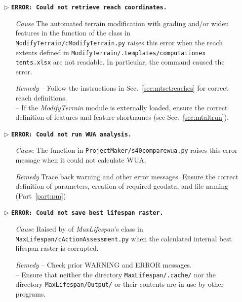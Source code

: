 \begin{itemize}
	\item[$\triangleright$]\textbf{\texttt{ERROR: Could not retrieve reach coordinates.}}
	\begin{itemize}
		\item[\textit{Cause}\hspace{0.27cm}] The automated terrain modification with grading and/or widen features in the  function of the  class in \texttt{ModifyTerrain/cModifyTerrain.py} raises this error when the reach extents defined in \texttt{ModifyTerrain/.templates/computation{\myUnderscore}ex tents.xlsx} are not readable. In particular, the command  caused the error.
		\item[\textit{Remedy}] -- Follow the instructions in Sec.~\ref{sec:mtsetreaches} for correct reach definitions.\\
								-- If the \textit{ModifyTerrain} module is externally loaded, ensure the correct definition of features and feature shortnames (see Sec.~\ref{sec:mtaltrun}).\\
	\end{itemize}
	
	\item[$\triangleright$]\textbf{\texttt{ERROR: Could not run WUA analysis.}}
	\begin{itemize}
		\item[\textit{Cause}\hspace{0.27cm}] The  function in \texttt{ProjectMaker/s40{\myUnderscore}compare{\myUnderscore}wua.py} raises this error message when it could not calculate WUA.
		\item[\textit{Remedy}] Trace back warning and other error messages. Ensure the correct definition of parameters, creation of required geodata, and file naming (Part~\ref{part:pm})\\
	\end{itemize}
	
	\item[$\triangleright$]\textbf{\texttt{ERROR: Could not save best lifespan raster.}}
	\begin{itemize}
		\item[\textit{Cause}\hspace{0.27cm}] Raised by  of \textit{MaxLifespan}'s  class in \texttt{MaxLifespan/cActionAssessment.py} when the calculated internal best lifespan raster is corrupted.
		\item[\textit{Remedy}] -- Check prior WARNING and ERROR messages.\\
								-- Ensure that neither the directory \texttt{MaxLifespan/.cache/} nor the directory \texttt{MaxLifespan/Output/} or their contents are in use by other programs.\\
	\end{itemize}
	

\end{itemize}
